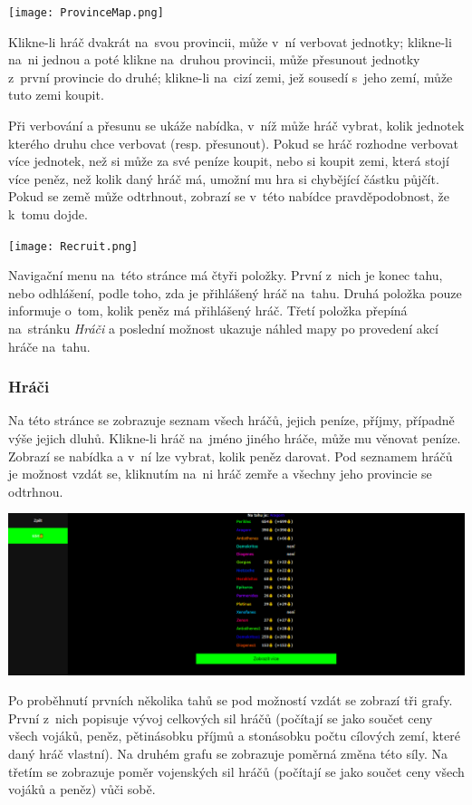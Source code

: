 \documentclass[a4paper,12pt]{article}
\begin{document}
\texttt{[image: ProvinceMap.png]}

Klikne-li hráč dvakrát na~svou provincii, může v~ní verbovat jednotky; klikne-li na~ni jednou a poté klikne na~druhou provincii, může přesunout jednotky z~první provincie do druhé; klikne-li na~cizí zemi, jež sousedí s~jeho zemí, může tuto zemi koupit.

Při verbování a přesunu se ukáže nabídka, v~níž může hráč vybrat, kolik jednotek kterého druhu chce verbovat (resp. přesunout). Pokud se hráč rozhodne verbovat více jednotek, než si může za své peníze koupit, nebo si koupit zemi, která stojí více peněz, než kolik daný hráč má, umožní mu hra si chybějící částku půjčít. Pokud se země může odtrhnout, zobrazí se v~této nabídce pravděpodobnost, že k~tomu dojde.

\texttt{[image: Recruit.png]}

Navigační menu na~této stránce má čtyři položky. První z~nich je konec tahu, nebo odhlášení, podle toho, zda je přihlášený hráč na~tahu. Druhá položka pouze informuje o~tom, kolik peněz má přihlášený hráč. Třetí položka přepíná na~stránku \textit{Hráči} a poslední možnost ukazuje náhled mapy po provedení akcí hráče na~tahu.
\subsubsection{Hráči}
Na této stránce se zobrazuje seznam všech hráčů, jejich peníze, příjmy, případně výše jejich dluhů. Klikne-li hráč na~jméno jiného hráče, může mu věnovat peníze. Zobrazí se nabídka a v~ní lze vybrat, kolik peněz darovat. Pod seznamem hráčů je možnost vzdát se, kliknutím na~ni hráč zemře a všechny jeho provincie se odtrhnou.

\includegraphics[width=\textwidth]{Players.png}

Po proběhnutí prvních několika tahů se pod možností vzdát se zobrazí tři grafy. První z~nich popisuje vývoj celkových sil hráčů (počítají se jako součet ceny všech vojáků, peněz, pětinásobku příjmů a stonásobku počtu cílových zemí, které daný hráč vlastní). Na druhém grafu se zobrazuje poměrná změna této síly. Na třetím se zobrazuje poměr vojenských sil hráčů (počítají se jako součet ceny všech vojáků a peněz) vůči sobě.
\end{document}
